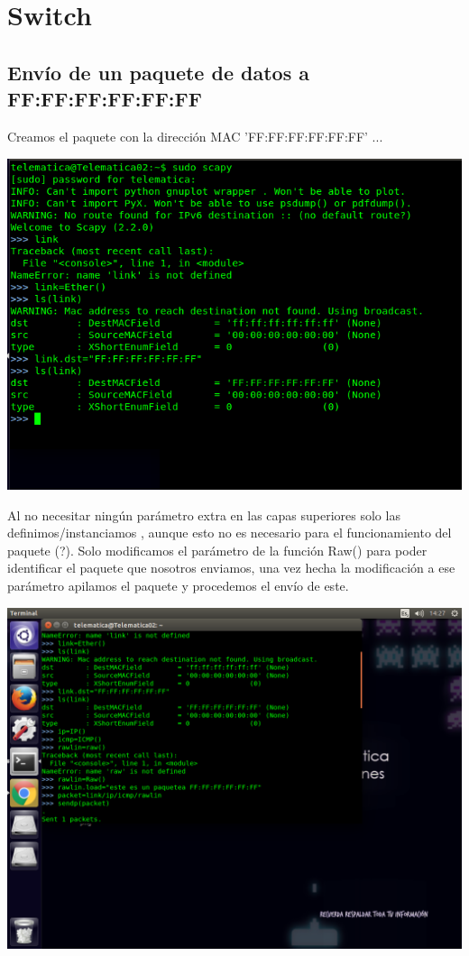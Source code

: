 ﻿\documentclass[spanish]{udpreport}
\begin{document}
\section{Switch}

\subsection{Envío de un paquete de datos a FF:FF:FF:FF:FF:FF}
Creamos el paquete con la dirección MAC 'FF:FF:FF:FF:FF:FF' ...

\begin{center}
	\includegraphics[scale=.37]{imagenes/Switch/Test_1a_b.png}
\end{center}

Al no necesitar ningún parámetro extra en las capas superiores solo las definimos/instanciamos , aunque esto no es necesario para el funcionamiento del paquete (?). Solo modificamos el parámetro de la función Raw() para poder identificar el paquete que nosotros enviamos, una vez hecha la modificación a ese parámetro apilamos el paquete y procedemos el envío de este.

\begin{center}
	\includegraphics[scale=.37]{imagenes/Switch/Test_1b.png}
\end{center} 
\end{document}
